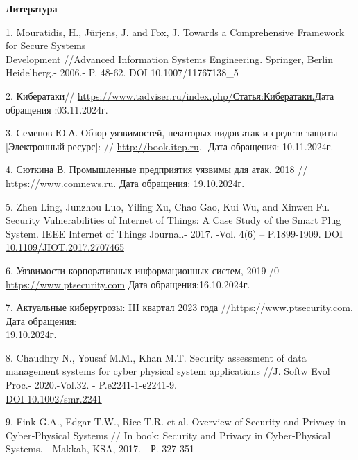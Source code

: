 \begin{center}
{\bfseries Литература}
\end{center}

\begin{references}
1. Mouratidis, H., Jürjens, J. and Fox, J. Towards a Comprehensive
Framework for Secure Systems \\Development //Advanced Information Systems
Engineering. Springer, Berlin Heidelberg.- 2006.- P. 48-62. DOI
10.1007/11767138\_5

2. Кибератаки//
\href{\%20https://www.tadviser.ru/index.php/Статья:Кибератаки.}{https://www.tadviser.ru/index.php/Статья:Кибератаки.}Дата
обращения :03.11.2024г.

3. Семенов Ю.А. Обзор уязвимостей, некоторых видов атак и средств защиты
{[}Электронный ресурс{]}: // \href{http://book.itep.ru/6/intrusion.htm}{http://book.itep.ru}.-
Дата обращения: 10.11.2024г.

4. Сюткина В. Промышленные предприятия уязвимы для атак, 2018 //
\href{https://www.comnews.ru/content/112938/2018-05-07/promyshlennye-predpriyatiya-uyazvimy-dlya-atak}{https://www.comnews.ru}.
Дата обращения: 19.10.2024г.

5. Zhen Ling, Junzhou Luo, Yiling Xu, Chao Gao, Kui Wu, and Xinwen Fu.
Security Vulnerabilities of Internet of Things: A Case Study of the
Smart Plug System. IEEE Internet of Things Journal.- 2017. -Vol. 4(6) --
P.1899-1909. DOI
\href{https://doi.org/10.1109/JIOT.2017.2707465}{10.1109/JIOT.2017.2707465}

6. Уязвимости корпоративных информационных систем, 2019 /0 \href{https://www.ptsecurity.com/ru-ru/research/analytics/corporate-vulnerabilities-2019}{https://www.ptsecurity.com}
Дата обращения:16.10.2024г.

7. Актуальные киберугрозы: III квартал 2023 года
//\href{https://www.ptsecurity.com/ru-ru/research/analytics/cybersecurity-threatscape-2023-q3}{https://www.ptsecurity.com}.
Дата обращения: \\19.10.2024г.

8. Chaudhry N., Yousaf M.M., Khan M.T. Security assessment of data
management systems for cyber physical system applications //J. Softw
Evol Proc.- 2020.-Vol.32. - P.e2241-1-е2241-9.
\\\href{https://doi.org/10.1002/smr.2241}{DOI 10.1002/smr.2241}

9. Fink G.A., Edgar T.W., Rice T.R. et al. Overview of Security and
Privacy in Cyber‐Physical Systems // In book: Security and Privacy in
Cyber‐Physical Systems. - Makkah, KSA, 2017. - Р. 327-351
\end{references}

